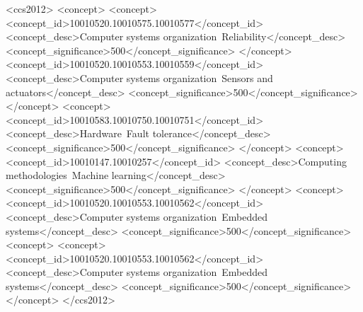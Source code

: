 


\begin{CCSXML}
	<ccs2012>
	<concept>
	<concept>
	<concept_id>10010520.10010575.10010577</concept_id>
	<concept_desc>Computer systems organization~Reliability</concept_desc>
	<concept_significance>500</concept_significance>
	</concept>
	<concept_id>10010520.10010553.10010559</concept_id>
	<concept_desc>Computer systems organization~Sensors and actuators</concept_desc>
	<concept_significance>500</concept_significance>
	</concept>
	<concept>
	<concept_id>10010583.10010750.10010751</concept_id>
	<concept_desc>Hardware~Fault tolerance</concept_desc>
	<concept_significance>500</concept_significance>
	</concept>
	<concept>
	<concept_id>10010147.10010257</concept_id>
	<concept_desc>Computing methodologies~Machine learning</concept_desc>
	<concept_significance>500</concept_significance>
	</concept>
	<concept>
	<concept_id>10010520.10010553.10010562</concept_id>
	<concept_desc>Computer systems organization~Embedded systems</concept_desc>
	<concept_significance>500</concept_significance>
	<concept>
	<concept>
	<concept_id>10010520.10010553.10010562</concept_id>
	<concept_desc>Computer systems organization~Embedded systems</concept_desc>
	<concept_significance>500</concept_significance>
	</concept>
	</ccs2012>
\end{CCSXML}
